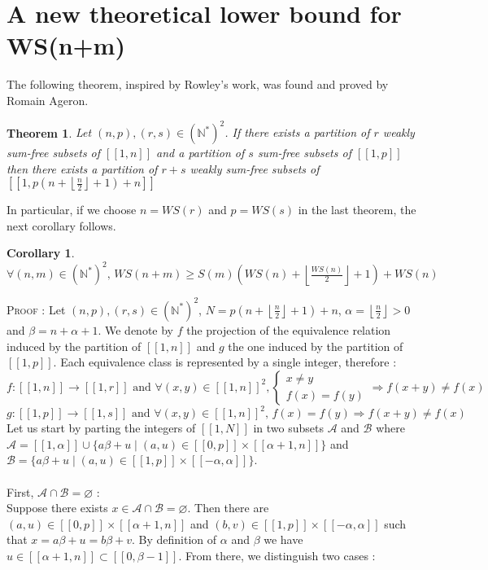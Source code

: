 \documentclass{article}
\newtheorem{theorem}{Theorem}[section]
\newtheorem{corollary}{Corollary}[theorem]
\begin{document}
\section{A new theoretical lower bound for WS(n+m)}
The following theorem, inspired by Rowley's work, was found and proved by Romain Ageron.
\begin{theorem}
Let $(n,p), (r,s) \in (\mathbb{N}^*)^2$. If there exists a partition of $r$ weakly sum-free subsets of $[\![1,n]\!]$ and a partition of $s$ sum-free subsets of $[\![1,p]\!]$ then there exists a partition of $r+s$ weakly sum-free subsets of $[\![1,p(n+\left \lfloor \frac{n}{2} \right \rfloor + 1)+n]\!]$
\end{theorem}
In particular, if we choose $n = WS(r)$ and $p = WS(s)$ in the last theorem, the next corollary follows.
\begin{corollary}
$ \forall (n,m) \in (\mathbb{N}^*)^2 \text{, } WS(n+m) \geqslant S(m) \left (WS(n) + \left \lfloor \frac{WS(n)}{2} \right \rfloor +1 \right) + WS(n)$
\end{corollary}
\textsc{Proof :} Let $(n,p), (r,s) \in (\mathbb{N}^*)^2$,  $N = p(n+\left \lfloor \frac{n}{2} \right \rfloor + 1)+n$, $\alpha = \left \lfloor \frac{n}{2} \right \rfloor > 0$ and $\beta = n + \alpha + 1$. We denote by $f$ the projection of the equivalence relation induced by the partition of $[\![1,n]\!]$ and $g$ the one induced by the partition of $[\![1,p]\!]$. Each equivalence class is represented by a single integer, therefore :
\[ f : [\![1,n]\!] \longrightarrow [\![1,r]\!] \text{ and } \forall (x,y) \in [\![1,n]\!]^2, \left\{
    \begin{array}{ll}
        x \neq y \\
        f(x) = f(y)
    \end{array}
\right.
\Longrightarrow f(x+y) \neq f(x)
\]
\[g : [\![1,p]\!] \longrightarrow [\![1,s]\!] \text{ and } \forall (x,y) \in [\![1,n]\!]^2 \text{, } f(x) = f(y) \Longrightarrow f(x+y) \neq f(x)
\]
Let us start by parting the integers of $[\![1,N]\!]$ in two subsets $\mathcal{A}$ and $\mathcal{B}$ where $\mathcal{A} = [\![1,\alpha]\!] \cup \{a\beta + u \mid (a,u) \in [\![0,p]\!] \times [\![\alpha + 1,n]\!]\}$ and $\mathcal{B} = \{a\beta + u \mid (a,u) \in [\![1,p]\!] \times [\![-\alpha,\alpha]\!]\}$.\\
\\
First, \underline{$\mathcal{A} \cap \mathcal{B} = \varnothing$} : \\
Suppose there exists $x \in \mathcal{A} \cap \mathcal{B} = \varnothing$. Then there are $(a,u) \in [\![0,p]\!] \times [\![\alpha + 1,n]\!]$ and $(b,v) \in [\![1,p]\!] \times [\![-\alpha,\alpha]\!]$ such that $x = a\beta + u = b\beta +v$. By definition of $\alpha$ and  $\beta$ we have $u \in [\![\alpha + 1,n]\!] \subset [\![0,\beta - 1]\!]$. From there, we distinguish two cases :
\end{document}
